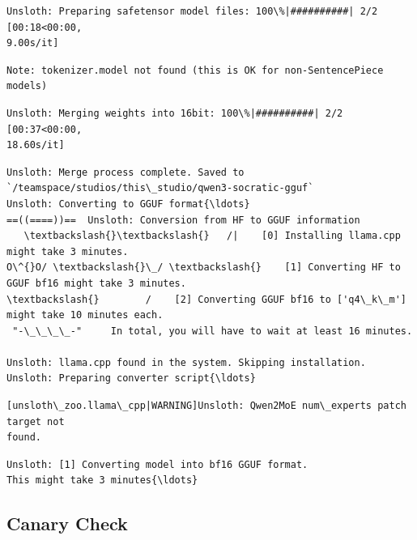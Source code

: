 \documentclass[11pt]{article}
\begin{document}
    
    \begin{Verbatim}[commandchars=\\\{\}]
Unsloth: Preparing safetensor model files: 100\%|##########| 2/2 [00:18<00:00,
9.00s/it]
    \end{Verbatim}

    \begin{Verbatim}[commandchars=\\\{\}]
Note: tokenizer.model not found (this is OK for non-SentencePiece models)
    \end{Verbatim}

    \begin{Verbatim}[commandchars=\\\{\}]
Unsloth: Merging weights into 16bit: 100\%|##########| 2/2 [00:37<00:00,
18.60s/it]
    \end{Verbatim}

    \begin{Verbatim}[commandchars=\\\{\}]
Unsloth: Merge process complete. Saved to
`/teamspace/studios/this\_studio/qwen3-socratic-gguf`
Unsloth: Converting to GGUF format{\ldots}
==((====))==  Unsloth: Conversion from HF to GGUF information
   \textbackslash{}\textbackslash{}   /|    [0] Installing llama.cpp might take 3 minutes.
O\^{}O/ \textbackslash{}\_/ \textbackslash{}    [1] Converting HF to GGUF bf16 might take 3 minutes.
\textbackslash{}        /    [2] Converting GGUF bf16 to ['q4\_k\_m'] might take 10 minutes each.
 "-\_\_\_\_-"     In total, you will have to wait at least 16 minutes.

Unsloth: llama.cpp found in the system. Skipping installation.
Unsloth: Preparing converter script{\ldots}
    \end{Verbatim}

    \begin{Verbatim}[commandchars=\\\{\}]
[unsloth\_zoo.llama\_cpp|WARNING]Unsloth: Qwen2MoE num\_experts patch target not
found.
    \end{Verbatim}

    \begin{Verbatim}[commandchars=\\\{\}]
Unsloth: [1] Converting model into bf16 GGUF format.
This might take 3 minutes{\ldots}
    \end{Verbatim}

    \subsection{Canary Check}\label{canary-check}
\end{document}

